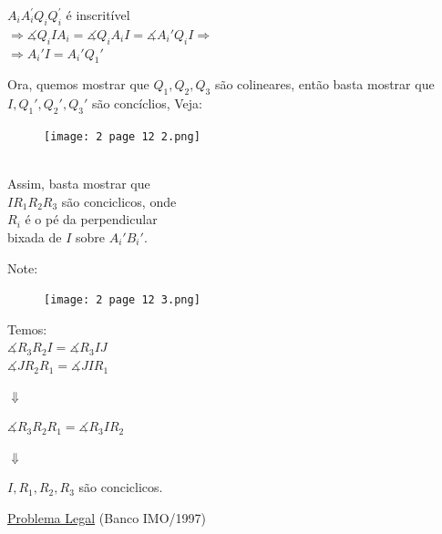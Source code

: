 \documentclass[a4paper,12pt]{article}
\theoremstyle{plain} %
\theoremstyle{definition} %
\theoremstyle{remark} %
\begin{document}
\begin{framed}
		$A_{i} A_{i}^{\prime} Q_{i} Q_{i}^{\prime}$ \'e inscrit\'ivel \\ $\Rightarrow \measuredangle Q_iIA_i=\measuredangle Q_iA_iI=\measuredangle A_i'Q_iI\Rightarrow$\\ $\Rightarrow A_i'I=A_i'Q_1'$
		
		\vspace{5em} Ora, quemos mostrar que $Q_1, Q_2, Q_3$ s\~ao colineares, ent\~ao basta mostrar que $I, Q_1', Q_2', Q_3'$ s\~ao conc\'iclios, Veja:
		
		\begin{figure}
			\texttt{[image: 2 page 12 2.png]}
		\end{figure} \, \\
		
		Assim, basta mostrar que\\
		$IR_1R_2R_3$ s\~ao conciclicos, onde\\
		$R_i$ \'e o p\'e da perpendicular\\
		bixada de $I$ sobre $A_i'B_i'$.
		
		\vspace{5em}
		
		Note:
		
		\begin{figure}
			\texttt{[image: 2 page 12 3.png]}
		\end{figure} Temos:\\
		
		$\measuredangle R_3R_2I=\measuredangle R_3IJ$\\
		
		$\measuredangle JR_2R_1=\measuredangle JIR_1$
		
		\hspace{4em}$\Downarrow$
		
		\hspace{3em}$\measuredangle R_3R_2R_1=\measuredangle R_3IR_2$
		
		\hspace{7.5em}$\Downarrow$
		
		\hspace{4em}$I,R_1,R_2,R_3$ s\~ao conciclicos. \tiny\textblock
		
		\normalsize
		\vspace{2em}
		
	\end{framed}
	
	\vspace{2ex}\underline{Problema Legal} (Banco IMO/1997)
	
\end{document}
